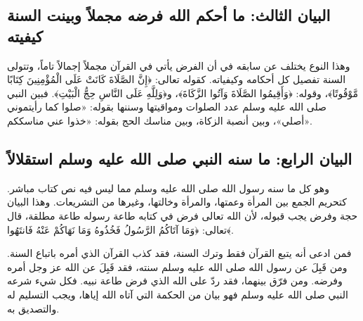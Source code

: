 \subsection{البيان الثالث: ما أحكم الله فرضه مجملاً وبينت السنة كيفيته}
وهذا النوع يختلف عن سابقه في أن الفرض يأتي في القرآن مجملاً إجمالاً تاماً، وتتولى السنة تفصيل كل أحكامه وكيفياته. كقوله تعالى: ﴿إِنَّ الصَّلَاةَ كَانَتْ عَلَى الْمُؤْمِنِينَ كِتَابًا مَّوْقُوتًا﴾، وقوله: ﴿وَأَقِيمُوا الصَّلَاةَ وَآتُوا الزَّكَاةَ﴾، و﴿وَلِلَّهِ عَلَى النَّاسِ حِجُّ الْبَيْتِ﴾. فبين النبي صلى الله عليه وسلم عدد الصلوات ومواقيتها وسننها بقوله: «صلوا كما رأيتموني أصلي»، وبين أنصبة الزكاة، وبين مناسك الحج بقوله: «خذوا عني مناسككم». 

\subsection{البيان الرابع: ما سنه النبي صلى الله عليه وسلم استقلالاً}
وهو كل ما سنه رسول الله صلى الله عليه وسلم مما ليس فيه نص كتاب مباشر. كتحريم الجمع بين المرأة وعمتها، والمرأة وخالتها، وغيرها من التشريعات. وهذا البيان حجة وفرض يجب قبوله، لأن الله تعالى فرض في كتابه طاعة رسوله طاعة مطلقة، قال تعالى: ﴿وَمَا آتَاكُمُ الرَّسُولُ فَخُذُوهُ وَمَا نَهَاكُمْ عَنْهُ فَانتَهُوا﴾. 

فمن ادعى أنه يتبع القرآن فقط وترك السنة، فقد كذب القرآن الذي أمره باتباع السنة. ومن قَبِلَ عن رسول الله صلى الله عليه وسلم سنته، فقد قَبِلَ عن الله عز وجل أمره وفرضه. ومن فرّق بينهما، فقد ردّ على الله الذي فرض طاعة نبيه. فكل شيء شرعه النبي صلى الله عليه وسلم فهو بيان من الحكمة التي آتاه الله إياها، ويجب التسليم له والتصديق به.